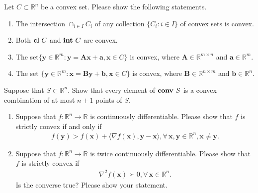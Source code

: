 \documentclass[11pt,letter,notitlepage]{article}
\theoremstyle{definition}
\DeclareMathOperator*{\intp}{\bf int\,}
\DeclareMathOperator*{\cl}{\bf cl\,}
\DeclareMathOperator*{\conv}{\bf conv\,}
\begin{document}
		
		\newpage
		
		\begin{exercise}
			Let $C \subset \mathbb{R}^n$ be a convex set. Please show the following statements.
			\begin{enumerate}
				\item The intersection $\cap_{i \in I}C_i$ of any collection $\{ C_i:i\in I \}$ of convex sets is convex.
				\item Both $\cl C $ and $\intp C $ are convex.
				\item The set$\{ \mathbf{y}\in\mathbb{R}^m:\mathbf{y}=\mathbf{Ax}+\mathbf{a},\mathbf{x}\in C \}$ is convex, where $\mathbf{A} \in \mathbb{R}^{m \times n}$ and $\mathbf{a} \in \mathbb{R}^m$.
				\item The set $\{ \mathbf{y}\in\mathbb{R}^m:\mathbf{x}=\mathbf{By}+\mathbf{b},\mathbf{x}\in C \}$ is convex, where $\mathbf{B} \in \mathbb{R}^{n \times m}$ and $\mathbf{b} \in \mathbb{R}^n$.
			\end{enumerate}
		\end{exercise}
		\begin{solution}
			
		\end{solution}
		
		\newpage
		
		\begin{exercise}
			Suppose that $S \subset \mathbb{R}^n$. Show that every element of $\conv S$ is a convex combination of at most $n + 1$ points of $S$.
		\end{exercise}
		\begin{solution}
			
		\end{solution}
		\newpage
		
		\begin{exercise}
			\begin{enumerate}
				\item Suppose that $f:\mathbb{R}^n \to \mathbb{R}$ is continuously differentiable. Please show that $f$ is strictly convex if and only if 
				\begin{align*}
					f(\mathbf{y})> f(\mathbf{x})+\langle\nabla f(\mathbf{x}),\mathbf{y}-\mathbf{x}\rangle, \forall\, \mathbf{x},\mathbf{y} \in\mathbb{R}^n, \mathbf{x}\not=\mathbf{y}.
				\end{align*}
				\item  Suppose that $f:\mathbb{R}^n \to \mathbb{R}$ is twice continuously differentiable. Please show that $f$ is strictly convex if 
				\begin{align*}
					\nabla^2 f(\mathbf{x}) \succ 0, \forall\, \mathbf{x} \in \mathbb{R}^n.
				\end{align*}
				Is the converse true? Please show your statement.
			\end{enumerate}
		\end{exercise}
		\begin{solution}
			
		\end{solution}
		\newpage
		
\end{document}
